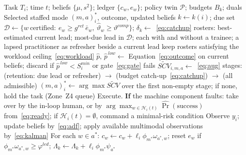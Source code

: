 \documentclass[utf8]{FrontiersinHarvard}
\begin{document}
	\begin{algorithm}[!htbp]
		\caption{Online capability-preserving allocation with adaptive learning and control transfer}
		\label{alg:scv}
		\begin{algorithmic}[1]
			\Require Task $T_i$; time $t$; beliefs $\{\mu,s^2\}$; ledger $\{c_w,e_w\}$; policy twin $\mathcal{P}$; budgets $B_k$; duals
			\Ensure Selected staffed mode $(m,a)^\ast_i$, outcome, updated beliefs
			\State $k\gets k(i)$; due set $\mathcal{D}\gets\{w\ \text{certified}:\ e_w \ge g^{ret}\,\bar e_w,\ \hat\vartheta_w\ge\vartheta^{comp}\}$; $\delta_k\gets$~\eqref{eq:catchup}
			\State rosters: best-estimated current lead; most-due lead in $\mathcal{D}$; each with and without a trainee; a lapsed practitioner as refresher beside a current lead
			\State keep rosters satisfying the workload ceiling~\eqref{eq:workload}
			\State $\hat p,\,\hat p^{\,low}\gets$ Equation~\eqref{eq:outcome} on current beliefs; discard if $\hat p^{\,low}<S^{min}_i$ or gate~\eqref{eq:gate} fails
			\State $\widetilde{SCV}_{i,m,a}\gets$~\eqref{eq:aug}
			\EndFor
			\EndFor
			\State stages: (retention: due lead or refresher) $\to$ (budget catch-up~\eqref{eq:catchup}) $\to$ (all admissible)
			\State $(m,a)^\ast_i\gets\arg\max\widetilde{SCV}$ over the first non-empty stage; if none, hold the task (Zone~Z4 queue)
			\State Execute. \textbf{If} the machine component faults: take over by the in-loop human, or by $\arg\max_{w\in\mathcal{H}_i(t)}\hat\Pr(\text{success})$ from~\eqref{eq:ready}; if $\mathcal{H}_i(t)=\emptyset$, command a minimal-risk condition
			\State Observe $y_i$; update beliefs by~\eqref{eq:adf}; apply available multimodal observations by~\eqref{eq:kalman}
			\State For each $w\in a^\ast$: $c_w\gets c_w+\ell_i\phi_{m^\ast}\omega_{a^\ast,w}$; reset $e_w$ if $\phi_{m^\ast}\omega_{a^\ast,w}\ge\varphi^{led}$; $\Lambda_k\gets\Lambda_k+\ell_i\phi_{m^\ast}\psi_{a^\ast}$
		\end{algorithmic}
	\end{algorithm}
\end{document}
